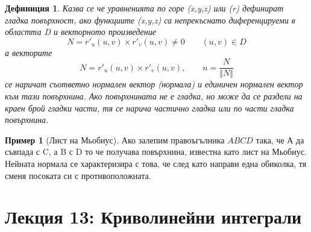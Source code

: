 \documentclass[a4paper,fleqn,12pt]{article}
\newtheorem{definition}{Дефиниция}[subsection]
\theoremstyle{definition}
\newtheorem{example}{Пример}[subsection]
\begin{document}
\begin{definition}
Казва се че уравненията по горе (x,y,z) или (r) дефинират гладка повърхност, ако функциите (x,y,z) са непрекъснато диференцируеми в областта D и векторното произведение 
$$N = r'_u (u,v) \times r'_v (u,v) \neq 0 \qquad (u,v) \in D$$
а векторите 
$$N = r'_u (u,v) \times r'_v (u,v), \qquad n = \frac{N}{\Vert N \Vert}$$
се наричат съответно нормален вектор (нормала) и единичен нормален вектор към тази повърхнина.
Ако повърхнината не е гладка, но може да се раздели на краен брой гладки части, тя се нарича частично гладка или по части гладка повърхнина.
\end{definition}

\begin{example}[Лист на Мьобиус]
Ако залепим правоъгълника $ABCD$ така, че А да съвпада с C, а B с D то че получава повърхнина, известна като лист на Мьобиус.
 Нейната нормала се характеризира с това, че след като направи една обиколка, тя сменя посоката си с противоположната. 
\end{example}

\newpage
\section{Лекция 13: Криволинейни интеграли}
\end{document}

